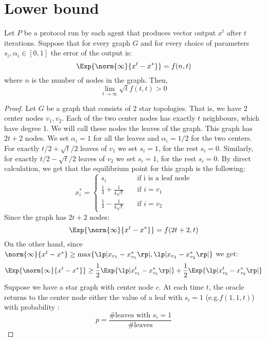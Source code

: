 \section{Lower bound}
\begin{theorem}\label{t:lower_bound_lecam}
Let $P$ be a protocol run by each agent that produces vector output $x^t$ after $t$ iterations. 
Suppose that for every graph $G$ and for every choice of parameters $s_i,\alpha_i \in [0,1]$ the error of the output is:
$$
\Exp{\norm{\infty}{x^t - x^*}} = f(n,t)
$$
where $n$ is the number of nodes in the graph. Then, 
$$
\lim_{t \to \infty} \sqrt{t} f(t,t) > 0
$$
\end{theorem}
\begin{proof}

Let $G$ be a graph that consists of 2 star topologies. That is, we have 2 center nodes $v_1, v_2$. Each of the two center nodes has exactly $t$ neighbours, which have degree 1. We will call these nodes the leaves of the graph. This graph has $2t+2$ nodes. We set $\alpha_i = 1$ for all the leaves and $\alpha_i = 1/2$ for the two centers. For exactly $t/2 + \sqrt{t}/2$ leaves of $v_1$ we set $s_i = 1$, for the rest $s_i = 0$. Similarly, for exactly $t/2 - \sqrt{t}/2$ leaves of $v_2$ we set $s_i = 1$, for the rest $s_i = 0$. By direct calculation, we get that the equilibrium point for this graph is the following:
$$
x_i^* = 
\begin{cases}
s_i &\quad\text{if i is a leaf node}\\
\frac{1}{4}+\frac{1}{4\sqrt{t}} &\quad\text{if } i = v_1\\
\frac{1}{4}-\frac{1}{4\sqrt{t}} &\quad\text{if } i = v_2
\end{cases}
$$
Since the graph has $2t+2$ nodes:
\begin{equation}\label{eq:f(2t,t)}
\Exp{\norm{\infty}{x^t - x^*}} = f(2t+2,t)
\end{equation}
On the other hand, since $\norm{\infty}{x^t - x^*} \geq \max\{\lp|x_{v_1} - x_{v_1}^*\rp|, \lp|x_{v_2} - x_{v_2}^*\rp|\}$ we get:
\begin{equation}\label{eq:mean}
\Exp{\norm{\infty}{x^t - x^*}} \geq \frac{1}{2} \Exp{\lp|x_{v_1}^t - x_{v_1}^*\rp|} + \frac{1}{2} \Exp{\lp|x_{v_2}^t - x_{v_2}^*\rp|}
\end{equation} 
Suppose we have a star graph with center node $c$. At each time $t$, the oracle returns to the center node either the value of a leaf with $s_i = 1$ (e.g.$f(1,1,t)$) with probability :
$$
p = \frac{\text{\# leaves with } s_i = 1}{\text{\# leaves}}
$$

\end{proof}
